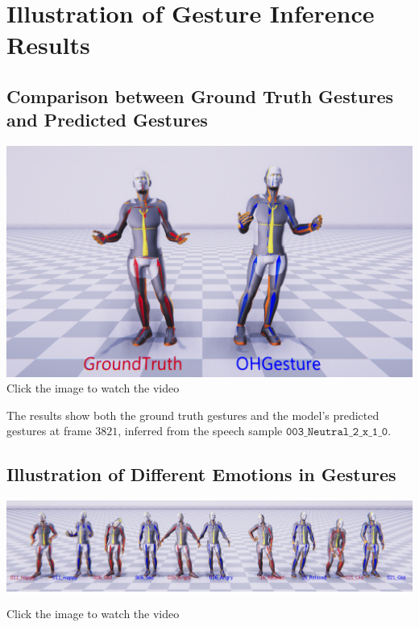 \section{Illustration of Gesture Inference Results}
\label{Appendix3}

\subsection{Comparison between Ground Truth Gestures and Predicted Gestures}

\begin{center}
	\centering
	\href{https://youtu.be/22lNm2tvmrk}{%
		\includegraphics[width=\linewidth]{images/GroundTruthCompare}}
	{\tiny Click the image to watch the video}
\end{center}

The results show both the ground truth gestures and the model's predicted gestures at frame $3821$, inferred from the speech sample $\texttt{003\_Neutral\_2\_x\_1\_0}$.

\subsection{Illustration of Different Emotions in Gestures}

{
	\begin{center}
		\centering
		\href{https://youtu.be/KUlBZXLtYJ4}{%
			\includegraphics[width=\linewidth]{images/DifferenceEmotion}}
		
		{\tiny Click the image to watch the video}
	\end{center}
}

